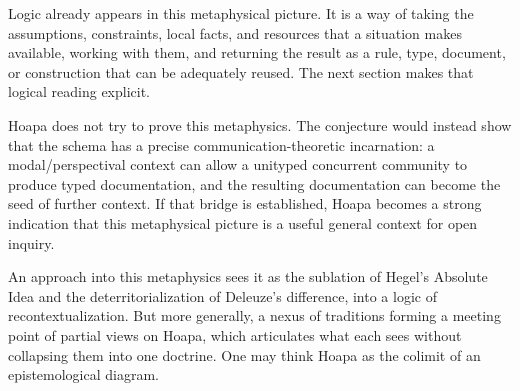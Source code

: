 \documentclass[11pt]{article}
\begin{document}
Logic already appears in this metaphysical picture. It is a way of taking the
assumptions, constraints, local facts, and resources that a situation makes
available, working with them, and returning the result as a rule, type,
document, or construction that can be adequately reused. The next section makes
that logical reading explicit.

Hoapa does not try to prove this metaphysics. The conjecture would instead
show that the schema has a precise communication-theoretic incarnation: a
modal/perspectival context can allow a unityped concurrent community to produce
typed documentation, and the resulting documentation can become the seed of
further context. If that bridge is established, Hoapa becomes a strong
indication that this metaphysical picture is a useful general context for open
inquiry.

An approach into this metaphysics sees it as the sublation of Hegel's Absolute
Idea and the deterritorialization of Deleuze's difference, into a logic of
recontextualization. But more generally, a nexus of traditions forming a
meeting point of partial views on Hoapa, which articulates what each sees
without collapsing them into one doctrine. One may think Hoapa as the colimit
of an epistemological diagram.
\end{document}
